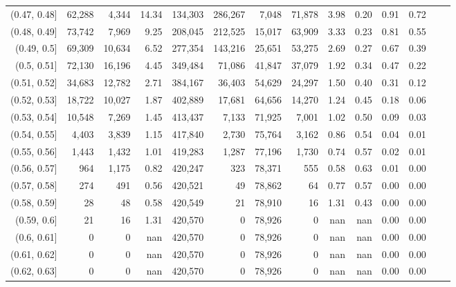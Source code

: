 \begin{tabular}{rrrrrrrrrrrrrr}
(0.47, 0.48]   &  62,288 &   4,344 &  14.34 &  134,303 &  286,267 &   7,048 &  71,878 &  3.98 &  0.20 &  0.91 &      0.72 \\
(0.48, 0.49]   &  73,742 &   7,969 &   9.25 &  208,045 &  212,525 &  15,017 &  63,909 &  3.33 &  0.23 &  0.81 &      0.55 \\
(0.49, 0.5]    &  69,309 &  10,634 &   6.52 &  277,354 &  143,216 &  25,651 &  53,275 &  2.69 &  0.27 &  0.67 &      0.39 \\
(0.5, 0.51]    &  72,130 &  16,196 &   4.45 &  349,484 &   71,086 &  41,847 &  37,079 &  1.92 &  0.34 &  0.47 &      0.22 \\
(0.51, 0.52]   &  34,683 &  12,782 &   2.71 &  384,167 &   36,403 &  54,629 &  24,297 &  1.50 &  0.40 &  0.31 &      0.12 \\
(0.52, 0.53]   &  18,722 &  10,027 &   1.87 &  402,889 &   17,681 &  64,656 &  14,270 &  1.24 &  0.45 &  0.18 &      0.06 \\
(0.53, 0.54]   &  10,548 &   7,269 &   1.45 &  413,437 &    7,133 &  71,925 &   7,001 &  1.02 &  0.50 &  0.09 &      0.03 \\
(0.54, 0.55]   &   4,403 &   3,839 &   1.15 &  417,840 &    2,730 &  75,764 &   3,162 &  0.86 &  0.54 &  0.04 &      0.01 \\
(0.55, 0.56]   &   1,443 &   1,432 &   1.01 &  419,283 &    1,287 &  77,196 &   1,730 &  0.74 &  0.57 &  0.02 &      0.01 \\
(0.56, 0.57]   &     964 &   1,175 &   0.82 &  420,247 &      323 &  78,371 &     555 &  0.58 &  0.63 &  0.01 &      0.00 \\
(0.57, 0.58]   &     274 &     491 &   0.56 &  420,521 &       49 &  78,862 &      64 &  0.77 &  0.57 &  0.00 &      0.00 \\
(0.58, 0.59]   &      28 &      48 &   0.58 &  420,549 &       21 &  78,910 &      16 &  1.31 &  0.43 &  0.00 &      0.00 \\
(0.59, 0.6]    &      21 &      16 &   1.31 &  420,570 &        0 &  78,926 &       0 &   nan &   nan &  0.00 &      0.00 \\
(0.6, 0.61]    &       0 &       0 &    nan &  420,570 &        0 &  78,926 &       0 &   nan &   nan &  0.00 &      0.00 \\
(0.61, 0.62]   &       0 &       0 &    nan &  420,570 &        0 &  78,926 &       0 &   nan &   nan &  0.00 &      0.00 \\
(0.62, 0.63]   &       0 &       0 &    nan &  420,570 &        0 &  78,926 &       0 &   nan &   nan &  0.00 &      0.00 \\

\end{tabular}

